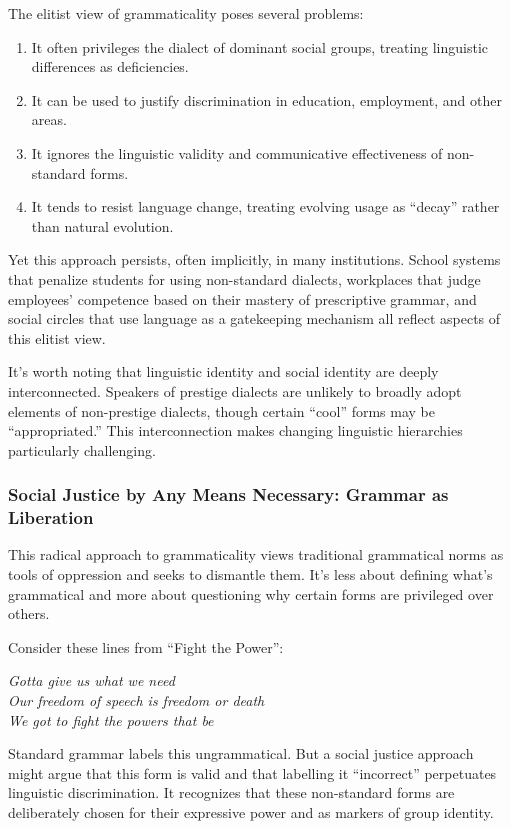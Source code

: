 The elitist view of grammaticality poses several problems:

\begin{enumerate}
    \item It often privileges the dialect of dominant social groups, treating linguistic differences as deficiencies.
    \item It can be used to justify discrimination in education, employment, and other areas.
    \item It ignores the linguistic validity and communicative effectiveness of non-standard forms.
    \item It tends to resist language change, treating evolving usage as ``decay'' rather than natural evolution.
\end{enumerate}

Yet this approach persists, often implicitly, in many institutions. School systems that penalize students for using non-standard dialects, workplaces that judge employees' competence based on their mastery of prescriptive grammar, and social circles that use language as a gatekeeping mechanism all reflect aspects of this elitist view.

It's worth noting that linguistic identity and social identity are deeply interconnected. Speakers of prestige dialects are unlikely to broadly adopt elements of non-pre\-stige dialects, though certain ``cool'' forms may be ``appropriated.'' This interconnection makes changing linguistic hierarchies particularly challenging.

\subsubsection{Social Justice by Any Means Necessary: Grammar as Liberation}

This radical approach to grammaticality views traditional grammatical norms as tools of oppression and seeks to dismantle them. It's less about defining what's grammatical and more about questioning why certain forms are privileged over others.

Consider these lines from ``Fight the Power'':

\ea
\textit{Gotta give us what we need\\
Our freedom of speech is freedom or death\\
We got to fight the powers that be}
\z

Standard grammar labels this ungrammatical. But a social justice approach might argue that this form is valid and that labelling it ``incorrect'' perpetuates linguistic discrimination. It recognizes that these non-standard forms are deliberately chosen for their expressive power and as markers of group identity.

